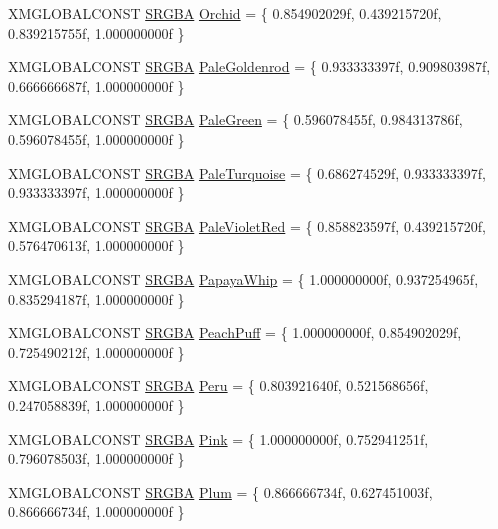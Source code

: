 \begin{DoxyCompactItemize}
X\+M\+G\+L\+O\+B\+A\+L\+C\+O\+N\+ST \hyperlink{structmage_1_1_s_r_g_b_a}{S\+R\+G\+BA} \hyperlink{namespacemage_1_1color_a5e7b07d4125c3c1fce9b8f0f9b0b9f4d}{Orchid} = \{ 0.\+854902029f, 0.\+439215720f, 0.\+839215755f, 1.\+000000000f \}
\item 
X\+M\+G\+L\+O\+B\+A\+L\+C\+O\+N\+ST \hyperlink{structmage_1_1_s_r_g_b_a}{S\+R\+G\+BA} \hyperlink{namespacemage_1_1color_a6c9f5530f16dfa219b0a881326058c9c}{Pale\+Goldenrod} = \{ 0.\+933333397f, 0.\+909803987f, 0.\+666666687f, 1.\+000000000f \}
\item 
X\+M\+G\+L\+O\+B\+A\+L\+C\+O\+N\+ST \hyperlink{structmage_1_1_s_r_g_b_a}{S\+R\+G\+BA} \hyperlink{namespacemage_1_1color_a3d95dc90a4afec7d0092f734396a6c27}{Pale\+Green} = \{ 0.\+596078455f, 0.\+984313786f, 0.\+596078455f, 1.\+000000000f \}
\item 
X\+M\+G\+L\+O\+B\+A\+L\+C\+O\+N\+ST \hyperlink{structmage_1_1_s_r_g_b_a}{S\+R\+G\+BA} \hyperlink{namespacemage_1_1color_a1aa94704fb56a939398357b938f476c9}{Pale\+Turquoise} = \{ 0.\+686274529f, 0.\+933333397f, 0.\+933333397f, 1.\+000000000f \}
\item 
X\+M\+G\+L\+O\+B\+A\+L\+C\+O\+N\+ST \hyperlink{structmage_1_1_s_r_g_b_a}{S\+R\+G\+BA} \hyperlink{namespacemage_1_1color_a97a3a91746e2efcb1eb2a7f335eed330}{Pale\+Violet\+Red} = \{ 0.\+858823597f, 0.\+439215720f, 0.\+576470613f, 1.\+000000000f \}
\item 
X\+M\+G\+L\+O\+B\+A\+L\+C\+O\+N\+ST \hyperlink{structmage_1_1_s_r_g_b_a}{S\+R\+G\+BA} \hyperlink{namespacemage_1_1color_ae5a2ee6874c7974e6299b964f50c8d69}{Papaya\+Whip} = \{ 1.\+000000000f, 0.\+937254965f, 0.\+835294187f, 1.\+000000000f \}
\item 
X\+M\+G\+L\+O\+B\+A\+L\+C\+O\+N\+ST \hyperlink{structmage_1_1_s_r_g_b_a}{S\+R\+G\+BA} \hyperlink{namespacemage_1_1color_a2c787fca871e90644915ac6b141aa367}{Peach\+Puff} = \{ 1.\+000000000f, 0.\+854902029f, 0.\+725490212f, 1.\+000000000f \}
\item 
X\+M\+G\+L\+O\+B\+A\+L\+C\+O\+N\+ST \hyperlink{structmage_1_1_s_r_g_b_a}{S\+R\+G\+BA} \hyperlink{namespacemage_1_1color_a31189488f43ecef8ed0e26625be2c73d}{Peru} = \{ 0.\+803921640f, 0.\+521568656f, 0.\+247058839f, 1.\+000000000f \}
\item 
X\+M\+G\+L\+O\+B\+A\+L\+C\+O\+N\+ST \hyperlink{structmage_1_1_s_r_g_b_a}{S\+R\+G\+BA} \hyperlink{namespacemage_1_1color_a96295d8cfec2a09119d549e085399ef2}{Pink} = \{ 1.\+000000000f, 0.\+752941251f, 0.\+796078503f, 1.\+000000000f \}
\item 
X\+M\+G\+L\+O\+B\+A\+L\+C\+O\+N\+ST \hyperlink{structmage_1_1_s_r_g_b_a}{S\+R\+G\+BA} \hyperlink{namespacemage_1_1color_ac5193659ac991faa8044fb2b9ea21f9c}{Plum} = \{ 0.\+866666734f, 0.\+627451003f, 0.\+866666734f, 1.\+000000000f \}

\end{DoxyCompactItemize}
